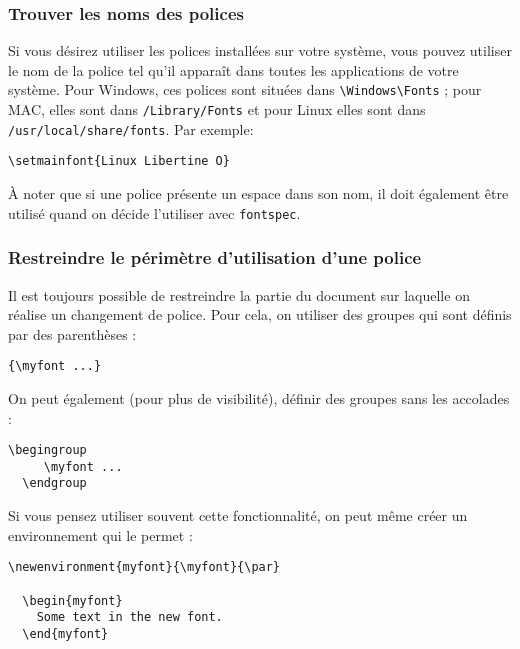 \subsubsection{Trouver les noms des polices}
Si vous désirez utiliser les polices installées sur votre système, vous pouvez utiliser le nom de la police tel qu'il apparaît dans toutes les applications de votre système. Pour Windows, ces polices sont situées dans \texttt{\textbackslash Windows\textbackslash Fonts} ; pour MAC, elles sont dans \texttt{/Library/Fonts} et pour Linux elles sont dans \texttt{/usr/local/share/fonts}. Par exemple:

\begin{lstlisting}[language={[LaTeX]TeX}]
  \setmainfont{Linux Libertine O}
\end{lstlisting}

À noter que si une police présente un espace dans son nom, il doit également être utilisé quand on décide l'utiliser avec \texttt{fontspec}.

\subsubsection{Restreindre le périmètre d'utilisation d'une police}
Il est toujours possible de restreindre la partie du document sur laquelle on réalise un changement de police. Pour cela, on utiliser des groupes qui sont définis par des parenthèses :

\begin{lstlisting}[language={[LaTeX]TeX}]
  {\myfont ...}
\end{lstlisting}

On peut également (pour plus de visibilité), définir des groupes sans les accolades :

\begin{lstlisting}[language={[LaTeX]TeX}]
  \begingroup
     \myfont ...
  \endgroup
\end{lstlisting}

Si vous pensez utiliser souvent cette fonctionnalité, on peut même créer un environnement qui le permet :

\begin{lstlisting}[language={[LaTeX]TeX}]
  \newenvironment{myfont}{\myfont}{\par}

  \begin{myfont}
    Some text in the new font.
  \end{myfont}
\end{lstlisting}

